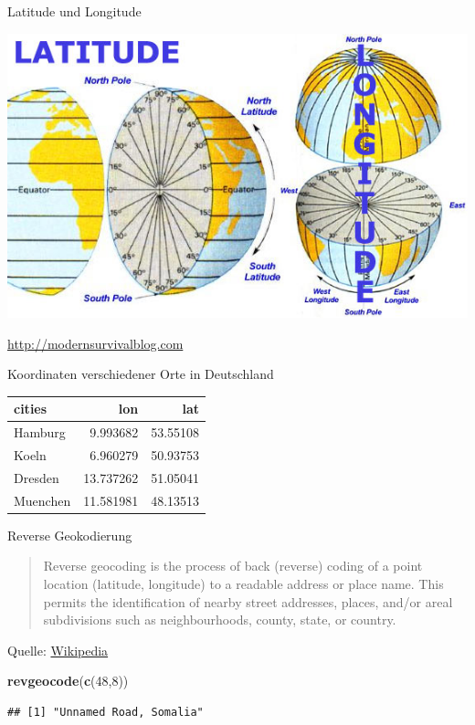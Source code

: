\documentclass[ignorenonframetext,]{beamer}
\newenvironment{Shaded}{}{}
\newcommand{\KeywordTok}[1]{\textcolor[rgb]{0.00,0.44,0.13}{\textbf{{#1}}}}
\newcommand{\DecValTok}[1]{\textcolor[rgb]{0.25,0.63,0.44}{{#1}}}
\newcommand{\NormalTok}[1]{{#1}}
\begin{document}
\begin{frame}{Latitude und Longitude}

\includegraphics{./tex2pdf.956/ddeb10457ad1d77e274118c007d518537082f34a.jpg}

\href{http://modernsurvivalblog.com/survival-skills/basic-map-reading-latitude-longitude/}{http://modernsurvivalblog.com}

\end{frame}

\begin{frame}{Koordinaten verschiedener Orte in Deutschland}

\begin{longtable}[]{@{}lrr@{}}
\toprule
cities & lon & lat\tabularnewline
\midrule
\endhead
Hamburg & 9.993682 & 53.55108\tabularnewline
Koeln & 6.960279 & 50.93753\tabularnewline
Dresden & 13.737262 & 51.05041\tabularnewline
Muenchen & 11.581981 & 48.13513\tabularnewline
\bottomrule
\end{longtable}

\end{frame}

\begin{frame}[fragile]{Reverse Geokodierung}

\begin{quote}
Reverse geocoding is the process of back (reverse) coding of a point
location (latitude, longitude) to a readable address or place name. This
permits the identification of nearby street addresses, places, and/or
areal subdivisions such as neighbourhoods, county, state, or country.
\end{quote}

Quelle:
\href{https://en.wikipedia.org/wiki/Reverse_geocoding}{Wikipedia}

\begin{Shaded}
\begin{Highlighting}[]
\KeywordTok{revgeocode}\NormalTok{(}\KeywordTok{c}\NormalTok{(}\DecValTok{48}\NormalTok{,}\DecValTok{8}\NormalTok{))}
\end{Highlighting}
\end{Shaded}

\begin{verbatim}
## [1] "Unnamed Road, Somalia"
\end{verbatim}

\end{frame}
\end{document}
